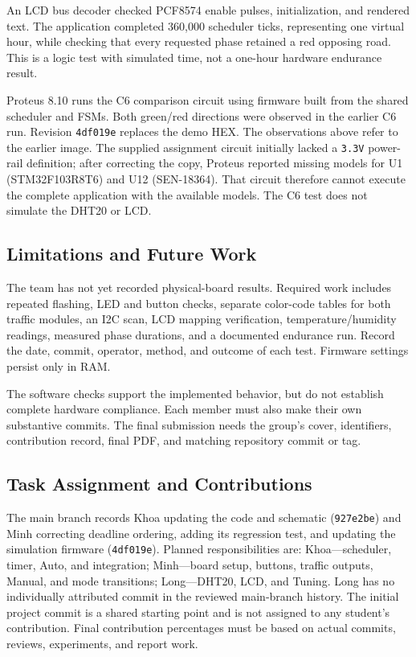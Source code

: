 An LCD bus decoder checked PCF8574 enable pulses, initialization, and rendered text. The application completed 360,000 scheduler ticks, representing one virtual hour, while checking that every requested phase retained a red opposing road. This is a logic test with simulated time, not a one-hour hardware endurance result.

Proteus 8.10 runs the C6 comparison circuit using firmware built from the shared scheduler and FSMs. Both green/red directions were observed in the earlier C6 run. Revision \texttt{4df019e} replaces the demo HEX. The observations above refer to the earlier image. The supplied assignment circuit initially lacked a \texttt{3.3V} power-rail definition; after correcting the copy, Proteus reported missing models for U1 (STM32F103R8T6) and U12 (SEN-18364). That circuit therefore cannot execute the complete application with the available models. The C6 test does not simulate the DHT20 or LCD.

\subsection{Limitations and Future Work}
The team has not yet recorded physical-board results. Required work includes repeated flashing, LED and button checks, separate color-code tables for both traffic modules, an I2C scan, LCD mapping verification, temperature/humidity readings, measured phase durations, and a documented endurance run. Record the date, commit, operator, method, and outcome of each test. Firmware settings persist only in RAM.

The software checks support the implemented behavior, but do not establish complete hardware compliance. Each member must also make their own substantive commits. The final submission needs the group's cover, identifiers, contribution record, final PDF, and matching repository commit or tag.

\subsection{Task Assignment and Contributions}
The main branch records Khoa updating the code and schematic (\texttt{927e2be}) and Minh correcting deadline ordering, adding its regression test, and updating the simulation firmware (\texttt{4df019e}).
Planned responsibilities are: Khoa---scheduler, timer, Auto, and integration; Minh---board setup, buttons, traffic outputs, Manual, and mode transitions; Long---DHT20, LCD, and Tuning. Long has no individually attributed commit in the reviewed main-branch history. The initial project commit is a shared starting point and is not assigned to any student's contribution. Final contribution percentages must be based on actual commits, reviews, experiments, and report work.

